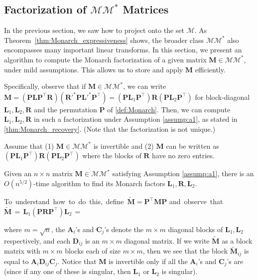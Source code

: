 \subsection{Factorization of $\mathcal{M}\mathcal{M}^*$ Matrices}
\label{subsec:recovery}
In the previous section, we saw how to project onto the set $\mathcal{M}$.
As Theorem~\ref{thm:Monarch_expressiveness} shows, the broader class $\mathcal{M}\mathcal{M}^*$ also encompasses many important linear transforms. In this section, we present an algorithm to compute the Monarch factorization of a given matrix $\mathbf{M} \in \mathcal{M}\mathcal{M}^*$, under mild assumptions. This allows us to store and apply $\mathbf{M}$ efficiently.

Specifically, observe that if $\mathbf{M} \in \mathcal{M}\mathcal{M}^*$, we can write $\mathbf{M} = (\mathbf{P}\mathbf{L} \mathbf{P}^\top \mathbf{R}) (\mathbf{R}'^* \mathbf{P}\mathbf{L}'^* \mathbf{P}^\top) = (\mathbf{P}\mathbf{L}_1\mathbf{P}^\top) \mathbf{R} (\mathbf{P}\mathbf{L}_2\mathbf{P}^\top)$ for block-diagonal $\mathbf{L}_1,\mathbf{L}_2,\mathbf{R}$ and the permutation $\mathbf{P}$ of \ref{def:Monarch}.
Then, we can compute $\mathbf{L}_1,\mathbf{L}_2,\mathbf{R}$ in such a factorization under Assumption \ref{assump:a1}, as stated in \ref{thm:Monarch_recovery}.  (Note that the factorization is not unique.)

\begin{assumption}
\label{assump:a1}
Assume that (1) $\mathbf{M} \in \mathcal{M}\mathcal{M}^*$ is invertible and (2) $\mathbf{M}$ can be written as $(\mathbf{P}\mathbf{L}_1\mathbf{P}^\top)\mathbf{R}(\mathbf{P}\mathbf{L}_2\mathbf{P}^\top)$ where the blocks of $\mathbf{R}$ have no zero entries.
\end{assumption}

\begin{theorem}\label{thm:Monarch_recovery}
Given an $n \times n$ matrix $\mathbf{M} \in \mathcal{M}\mathcal{M}^*$ satisfying Assumption \ref{assump:a1}, there is an $O(n^{5/2})$-time algorithm to find its Monarch factors $\mathbf{L}_1, \mathbf{R}, \mathbf{L}_2$.
\end{theorem}

\mbox{To understand how to do this, define $\tilde{\mathbf{M}} = \mathbf{P}^\top \mathbf{M}\mathbf{P}$} \mbox{and observe that $\tilde{\mathbf{M}}\, = \, \mathbf{L}_1 (\mathbf{P}\mathbf{R}\mathbf{P}^\top) \mathbf{L}_2 \, =$} 

where $m = \sqrt{n}$, the $\mathbf{A}_i$'s and $\mathbf{C}_j$'s denote the $m \times m$ diagonal blocks of $\mathbf{L}_1,\mathbf{L}_2$ respectively, and each $\mathbf{D}_{ij}$ is an $m \times m$ diagonal matrix. If we write $\widetilde{\mathbf{M}}$ as a block matrix with $m \times m$ blocks each of size $m \times m$, then we see that the block $\widetilde{\mathbf{M}}_{ij}$ is equal to $\mathbf{A}_i \mathbf{D}_{ij} \mathbf{C}_j$. Notice that $\mathbf{M}$ is invertible only if all the $\mathbf{A}_i$'s and $\mathbf{C}_j$'s are (since if any one of these is singular, then $\mathbf{L}_1$ or $\mathbf{L}_2$ is singular).


